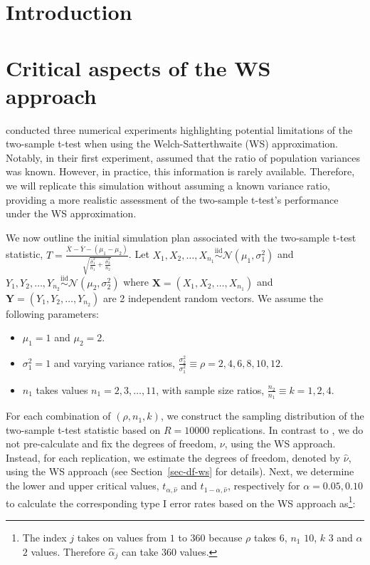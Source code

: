 \documentclass[
  12pt]{article}
\providecommand{\tightlist}{%
  \setlength{\itemsep}{0pt}\setlength{\parskip}{0pt}}\usepackage{longtable,booktabs,array}
\begin{document}
\section{Introduction}\label{sec-intro}

\section{Critical aspects of the WS
approach}\label{critical-aspects-of-the-ws-approach}

\citet{lloyd_2-sample_2013} conducted three numerical experiments
highlighting potential limitations of the two-sample t-test when using
the Welch-Satterthwaite (WS) approximation. Notably, in their first
experiment, \citet{lloyd_2-sample_2013} assumed that the ratio of
population variances was known. However, in practice, this information
is rarely available. Therefore, we will replicate this simulation
without assuming a known variance ratio, providing a more realistic
assessment of the two-sample t-test's performance under the WS
approximation.

We now outline the initial simulation plan associated with the
two-sample t-test statistic,
\(T = \frac{\overline{X} - \overline{Y} - (\mu_1 - \mu_2)}{\sqrt{\frac{\widehat{\sigma}^2_1}{n_1} + \frac{\widehat{\sigma}^2_2}{n_2}}}\).
Let
\(X_1, X_2, \ldots, X_{n_1} \overset{\text{iid}}{\sim} \mathcal{N}(\mu_1, \sigma_1^2)\)
and
\(Y_1, Y_2, \ldots, Y_{n_2} \overset{\text{iid}}{\sim} \mathcal{N}(\mu_2, \sigma_2^2)\)
where \(\mathbf{X} = (X_1, X_2, \ldots, X_{n_1})\) and
\(\mathbf{Y} = (Y_1, Y_2, \ldots, Y_{n_2})\) are 2 independent random
vectors. We assume the following parameters:

\begin{itemize}
\tightlist
\item
  \(\mu_1 = 1\) and \(\mu_2 = 2\).
\item
  \(\sigma^2_1 = 1\) and varying variance ratios,
  \(\frac{\sigma^2_2}{\sigma^2_1} \equiv \rho = 2, 4, 6, 8, 10, 12\).
\item
  \(n_1\) takes values \(n_1 = 2, 3, \ldots, 11\), with sample size
  ratios, \(\frac{n_2}{n_1} \equiv k = 1, 2, 4\).
\end{itemize}

For each combination of \((\rho, n_1, k)\), we construct the sampling
distribution of the two-sample t-test statistic based on \(R = 10000\)
replications. In contrast to \citet{lloyd_2-sample_2013}, we do not
pre-calculate and fix the degrees of freedom, \(\nu\), using the WS
approach. Instead, for each replication, we estimate the degrees of
freedom, denoted by \(\widehat{\nu}\), using the WS approach (see
Section~\ref{sec-df-ws} for details). Next, we determine the lower and
upper critical values, \(t_{\alpha,\widehat{\nu}}\) and
\(t_{1-\alpha,\widehat{\nu}}\), respectively for \(\alpha = 0.05, 0.10\)
to calculate the corresponding type I error rates based on the WS
approach as\footnote{The index \(j\) takes on values from \(1\) to
  \(360\) because \(\rho\) takes \(6\), \(n_1\) \(10\), \(k\) \(3\) and
  \(\alpha\) \(2\) values. Therefore \(\widehat{\alpha}_j\) can take
  \(360\) values.}:
\end{document}
